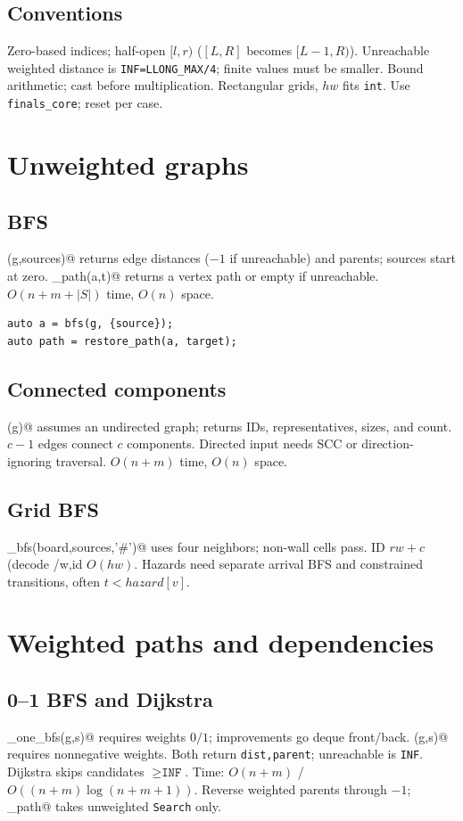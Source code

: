 \subsection{Conventions}
Zero-based indices; half-open $[l,r)$ ($[L,R]$ becomes $[L-1,R)$).
Unreachable weighted distance is \texttt{INF=LLONG\_MAX/4}; finite values
must be smaller. Bound arithmetic; cast before multiplication. Rectangular
grids, $hw$ fits \texttt{int}. Use \texttt{finals\_core}; reset per case.


\section{Unweighted graphs}
\subsection{BFS}
\verb@bfs(g,sources)@ returns edge distances ($-1$ if unreachable) and
parents; sources start at zero. \verb@restore_path(a,t)@ returns a vertex
path or empty if unreachable. $O(n+m+|S|)$ time, $O(n)$ space.
\begin{lstlisting}
auto a = bfs(g, {source});
auto path = restore_path(a, target);
\end{lstlisting}

\subsection{Connected components}
\verb@components(g)@ assumes an undirected graph; returns IDs, representatives,
sizes, and count. $c-1$ edges connect $c$ components.
Directed input needs SCC or direction-ignoring traversal. $O(n+m)$ time,
$O(n)$ space.

\subsection{Grid BFS}
\verb@grid_bfs(board,sources,'#')@ uses four neighbors; non-wall cells pass.
ID $rw+c$ (decode \verb@id/w,id%w@). Sources in bounds; wall sources ignored.
$O(hw)$. Hazards need separate arrival BFS and constrained transitions, often
$t<\mathit{hazard}[v]$.

\section{Weighted paths and dependencies}
\subsection{0--1 BFS and Dijkstra}
\verb@zero_one_bfs(g,s)@ requires weights $0/1$; improvements go deque
front/back. \verb@dijkstra(g,s)@ requires nonnegative weights.
Both return \texttt{dist,parent}; unreachable is \texttt{INF}. Dijkstra skips
candidates $\ge\texttt{INF}$. Time: $O(n+m)$ / $O((n+m)\log(n+m+1))$.
Reverse weighted parents through $-1$; \verb@restore_path@ takes unweighted
\texttt{Search} only.

